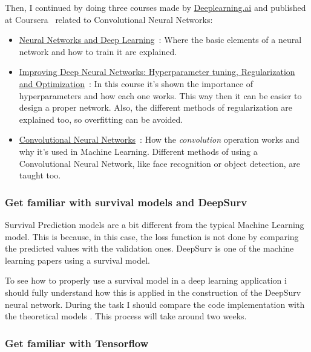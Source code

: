 Then, I continued by doing three courses made by \href{https://www.deeplearning.ai}{Deeplearning.ai}
and published at Coursera~\cite{Coursera} related to Convolutional Neural Networks:
\begin{itemize}
    \item \href{https://www.coursera.org/learn/neural-networks-deep-learning}{Neural Networks and 
        Deep Learning}~\cite{Coursera:NN}: Where the basic elements of a neural network and how
        to train it are explained.

    \item \href{https://www.coursera.org/learn/deep-neural-network}{Improving Deep Neural Networks: 
        Hyperparameter tuning, Regularization and Optimization}~\cite{Coursera:NNHyperparameters}: 
        In this course it's shown the importance of hyperparameters and how each one works. 
        This way then it can be easier to design a proper network. Also, the different methods 
        of regularization are explained too, so overfitting can be avoided.

    \item \href{https://www.coursera.org/learn/convolutional-neural-networks}{Convolutional Neural 
        Networks}~\cite{Coursera:CNN}:
        How the \emph{convolution} operation works and why it's used in Machine Learning. 
        Different methods of using a Convolutional Neural Network, like face recognition or 
        object detection, are taught too.
\end{itemize}

\subsubsection{Get familiar with survival models and DeepSurv}

Survival Prediction models are a bit different from the typical Machine Learning model. This is
because, in this case, the loss function is not done by comparing the predicted values with 
the validation ones. DeepSurv is one of the machine learning papers using a survival model.

To see how to properly use a survival model in a deep learning application i should fully 
understand how this is applied in the construction of the DeepSurv neural network. During the task
I should compare the code implementation with the theoretical models
\cites{Cox}{DeepSurv}.
This process will take around two weeks.

\subsubsection{Get familiar with Tensorflow}

